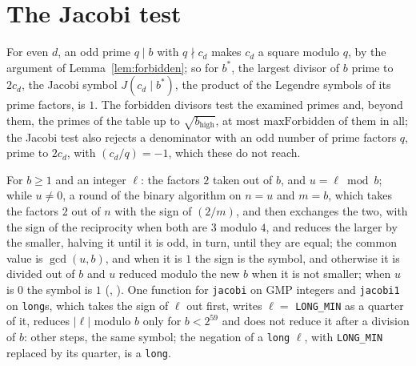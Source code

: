 \section{The Jacobi test}\label{sec:jacobi}

For even $d$, an odd prime $q \mid b$ with $q \nmid c_d$ makes $c_d$ a square modulo $q$, by the
argument of Lemma~\ref{lem:forbidden}; so for $b^*$, the largest divisor of $b$ prime to $2 c_d$,
the Jacobi symbol $J(c_d \mid b^*)$, the product of the Legendre symbols of its prime factors, is
$1$. The forbidden divisors test the examined primes and, beyond them, the primes of the table up
to $\sqrt{b_{\mathrm{high}}}$, at most $\mathrm{maxForbidden}$ of them in all; the Jacobi test also
rejects a denominator with an odd number of prime factors $q$, prime to $2 c_d$, with
$(c_d / q) = -1$, which these do not reach.

\begin{definition}\label{def:jacobi}
  \leanok
  For $b \ge 1$ and an integer $\ell$: the factors $2$ taken out of $b$, and $u = \ell \bmod b$;
  while $u \ne 0$, a round of the binary algorithm on $n = u$ and $m = b$, which takes the factors
  $2$ out of $n$ with the sign of $(2 / m)$, and then exchanges the two, with the sign of the
  reciprocity when both are $3$ modulo $4$, and reduces the larger by the smaller, halving it until
  it is odd, in turn, until they are equal; the common value is $\gcd(u, b)$, and when it is $1$ the
  sign is the symbol, and otherwise it is divided out of $b$ and $u$ reduced modulo the new $b$ when
  it is not smaller; when $u$ is $0$ the symbol is $1$ (,
  ). One function for \verb|jacobi| on GMP integers and
  \verb|jacobi1| on \verb|long|s, which takes the sign of $\ell$ out first, writes
  $\ell = $ \verb|LONG_MIN| as a quarter of it, reduces $|\ell|$ modulo $b$ only for $b < 2^{59}$
  and does not reduce it after a division of $b$: other steps, the same symbol; the negation of a
  \verb|long| $\ell$, with \verb|LONG_MIN| replaced by its quarter, is a \verb|long|.
\end{definition}

